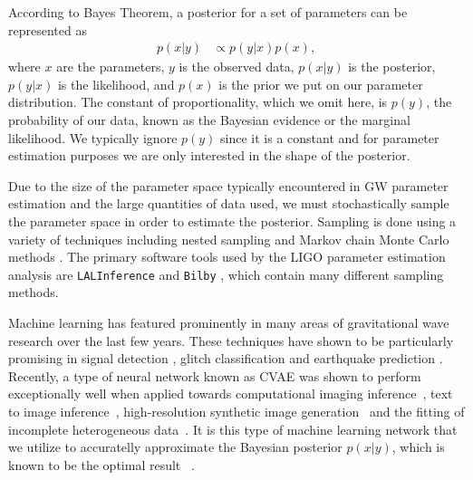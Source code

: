 \documentclass[%
showpacs,
 amsmath,amssymb,
 aps,
 twocolumn,
 prl,
 reprint,
floatfix,
]{revtex4-1}
\begin{document}
%
%
According to Bayes Theorem, a posterior for a set of parameters can be
represented as
%
\begin{align}\label{eq:bayes_theorem}
    p(x|y) &\propto p(y|x) p(x),
\end{align}
%
where $x$ are the parameters, $y$ is the observed data, $p(x|y)$ is the
posterior, $p(y|x)$ is the likelihood, and $p(x)$ is the prior we put on our
parameter distribution. The constant of proportionality, which we omit here, is
$p(y)$, the probability of our data, known as the Bayesian evidence or the
marginal likelihood. We typically ignore $p(y)$ since it is a constant and for
parameter estimation purposes we are only interested in the shape of the
posterior.

Due to the size of the parameter space typically encountered in \ac{GW} 
parameter estimation and the large quantities of data used, we must 
stochastically sample the parameter space in order to estimate 
the posterior. Sampling is done using a 
variety of techniques including nested sampling 
\cite{cpnest,dynesty} and Markov chain Monte Carlo methods \cite{emcee,ptemcee}. The primary software tools used by the \ac{LIGO} 
parameter estimation analysis are \texttt{LALInference} and 
\texttt{Bilby} \cite{1409.7215,1811.02042}, which contain many 
different sampling methods.  
  
%
%
Machine learning has featured prominently in many areas of gravitational wave
research over the last few years. These techniques have shown to be
particularly promising in signal detection
\cite{GEORGE201864,PhysRevLett.120.141103,1904.08693}, glitch classification
\cite{1706.07446,0264-9381-34-6-064003} and earthquake prediction
\cite{Coughlin_2017}. Recently, a type of neural network known as \ac{CVAE} was
shown to perform exceptionally well when applied towards computational imaging
inference~\cite{1904.06264,NIPS2015_5775}, text to image
inference~\cite{1512.00570}, high-resolution synthetic image
generation~\cite{1612.00005} and the fitting of incomplete heterogeneous
data~\cite{1807.03653}. It is this type of machine learning network that we
utilize to accuratelly approximate the Bayesian posterior $p(x|y)$, which is
known to be the optimal result ~\cite{0809.2809}.
\end{document}
